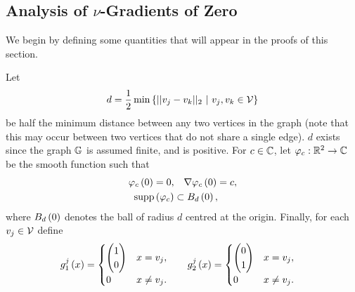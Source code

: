 \subsection{Analysis of $\nu$-Gradients of Zero} \label{appS:VertexGradZero}
We begin by defining some quantities that will appear in the proofs of this section.
\begin{definition} \label{def:UsefulObjects}
	Let 
	\begin{align*}
		d=\recip{2}\min\clbracs{\norm{v_j-v_k}_2 \ \vert \ v_j,v_k\in\vertSet}
	\end{align*}
	be half the minimum distance between any two vertices in the graph (note that this may occur between two vertices that do not share a single edge).
	$d$ exists since the graph $\mathbb{G}$ is assumed finite, and is positive.
	For $c\in\mathbb{C}$, let $\varphi_c:\mathbb{R}^2\rightarrow\mathbb{C}$ be the smooth function such that
	\begin{align*}
		\varphi_c\left( 0 \right) = 0, &\quad \nabla\varphi_c\left( 0 \right) = c, \\
		\mathrm{supp}\left( \varphi_c \right) &\subset B_{d}\left( 0 \right),
	\end{align*}
	where $B_{d}\left( 0 \right)$ denotes the ball of radius $d$ centred at the origin.
	Finally, for each $v_j\in\mathcal{V}$ define
	\begin{align*}
		g^j_1\left( x \right) &=
		\begin{cases}
			\begin{pmatrix} 1 \\ 0 \end{pmatrix} & x=v_j, \\
			0 & x\neq v_j. \\
		\end{cases}
		&\quad
		g^j_2\left( x \right) &=
		\begin{cases}
			\begin{pmatrix} 0 \\ 1 \end{pmatrix} & x=v_j, \\
			0 & x\neq v_j. \\
		\end{cases}
	\end{align*}
\end{definition}

